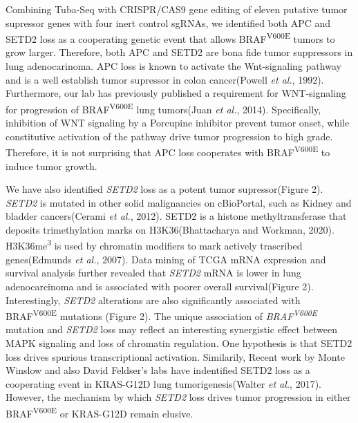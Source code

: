 Combining Tuba-Seq with CRISPR/CAS9 gene editing of eleven putative tumor supressor genes with four inert control sgRNAs, we identified both APC and SETD2 loss as a cooperating genetic event that allows BRAF\textsuperscript{V600E} tumors to grow larger. Therefore, both APC and SETD2 are bona fide tumor suppressors in lung adenocarinoma. APC loss is known to activate the Wnt-signaling pathway and is a well establish tumor supressor in colon cancer(Powell \emph{et al.}, 1992). Furthermore, our lab has previously published a requirement for WNT-signaling for progression of BRAF\textsuperscript{V600E} lung tumors(Juan \emph{et al.}, 2014). Specifically, inhibition of WNT signaling by a Porcupine inhibitor prevent tumor onset, while constitutive activation of the pathway drive tumor progression to high grade. Therefore, it is not surprising that APC loss cooperates with BRAF\textsuperscript{V600E} to induce tumor growth.

We have also identified \emph{SETD2} loss as a potent tumor supressor(Figure 2). \emph{SETD2} is mutated in other solid malignancies on cBioPortal, such as Kidney and bladder cancers(Cerami \emph{et al.}, 2012). SETD2 is a histone methyltransferase that deposits trimethylation marks on H3K36(Bhattacharya and Workman, 2020). H3K36me\textsuperscript{3} is used by chromatin modifiers to mark actively trascribed genes(Edmunds \emph{et al.}, 2007). Data mining of TCGA mRNA expression and survival analysis further revealed that \emph{SETD2} mRNA is lower in lung adenocarcinoma and is associated with poorer overall survival(Figure 2). Interestingly, \emph{SETD2} alterations are also significantly associated with BRAF\textsuperscript{V600E} mutations (Figure 2). The unique association of \emph{BRAF\textsuperscript{V600E}} mutation and \emph{SETD2} loss may reflect an interesting synergistic effect between MAPK signaling and loss of chromatin regulation. One hypothesis is that SETD2 loss drives spurious transcriptional activation. Similarily, Recent work by Monte Winslow and also David Feldser's labs have indentified SETD2 loss as a cooperating event in KRAS-G12D lung tumorigenesis(Walter \emph{et al.}, 2017). However, the mechanism by which \emph{SETD2} loss drives tumor progression in either BRAF\textsuperscript{V600E} or KRAS-G12D remain elusive.

